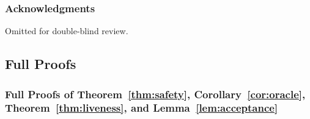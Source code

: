 \documentclass{article}
\begin{document}
\subsubsection*{Acknowledgments}
Omitted for double-blind review.

\subsection{Full Proofs}\label{app:proofs}

\subsubsection{Full Proofs of \texorpdfstring{Theorem~\ref{thm:safety}, Corollary~\ref{cor:oracle}, Theorem~\ref{thm:liveness}, and Lemma~\ref{lem:acceptance}}{the safety and liveness results}}
\end{document}
